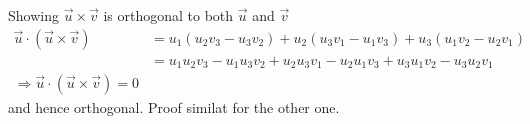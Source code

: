 \begin{note}
	Showing  $\vec{u} \times \vec{v}$ is orthogonal to both $\vec{u}$ and $\vec{v}$
	\begin{align*}
		\vec{u} \cdot (\vec{u} \times \vec{v}) & = u_1(u_2v_3 - u_3v_2) + u_2(u_3v_1 - u_1v_3) + u_3(u_1v_2 - u_2v_1)    \\
		                                       & = u_1u_2v_3 - u_1u_3v_2 + u_2u_3v_1 - u_2u_1v_3 + u_3u_1v_2 - u_3u_2v_1 \\
		\Rightarrow \vec{u} \cdot (\vec{u} \times \vec{v}) = 0
	\end{align*}
	and hence orthogonal. Proof similat for the other one.
\end{note}
